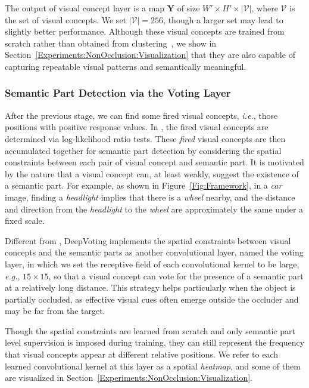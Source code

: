 \documentclass[10pt,twocolumn,letterpaper]{article}
\begin{document}
  The output of visual concept layer is a map $\mathbf{Y}$ of size $W'\times H'\times\left|\mathcal{V}\right|$, where $\mathcal{V}$ is the set of visual concepts. We set ${\left|\mathcal{V}\right|}={256}$, though a larger set may lead to slightly better performance. Although these visual concepts are trained from scratch rather than obtained from clustering~\cite{Wang_2017_VC_journal}, we show in Section~\ref{Experiments:NonOcclusion:Visualization} that they are also capable of capturing repeatable visual patterns and semantically meaningful.


  \subsubsection{Semantic Part Detection via the Voting Layer}
  \label{Framework:Formulation:Voting}

  After the previous stage, we can find some fired visual concepts, {\em i.e.}, those positions with positive response values. In \cite{wang2017detecting}, the fired visual concepts are determined via log-likelihood ratio tests. These {\em fired} visual concepts are then accumulated together for semantic part detection by considering the spatial constraints between each pair of visual concept and semantic part. It is motivated by the nature that a visual concept can, at least weakly, suggest the existence of a semantic part. For example, as shown in Figure~\ref{Fig:Framework}, in a {\em car} image, finding a {\em headlight} implies that there is a {\em wheel} nearby, and the distance and direction from the {\em headlight} to the {\em wheel} are approximately the same under a fixed scale.

  Different from \cite{wang2017detecting}, DeepVoting implements the spatial constraints between visual concepts and the semantic parts as another convolutional layer, named the voting layer, in which we set the receptive field of each convolutional kernel to be large, {\em e.g.}, $15\times15$, so that a visual concept can vote for the presence of a semantic part at a relatively long distance. This strategy helps particularly when the object is partially occluded, as effective visual cues often emerge outside the occluder and may be far from the target.

  Though the spatial constraints are learned from scratch and only semantic part level supervision is imposed during training, they can still represent the frequency that  visual concepts appear at different relative positions. We refer to each learned convolutional kernel at this layer as a spatial {\em heatmap}, and some of them are visualized in Section~\ref{Experiments:NonOcclusion:Visualization}.
\end{document}

